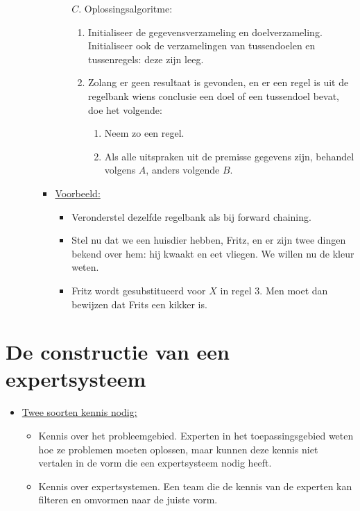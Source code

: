 \begin{itemize}
\begin{itemize}
\begin{itemize}
\begin{enumerate}
\begin{enumerate}
				\end{enumerate}
				\item[$C.$] Oplossingsalgoritme:
				\begin{enumerate}
					\item Initialiseer de gegevensverzameling en doelverzameling. Initialiseer ook de verzamelingen van tussendoelen en tussenregels: deze zijn leeg.
					\item Zolang er geen resultaat is gevonden, en er een regel is uit de regelbank wiens conclusie een doel of een tussendoel bevat, doe het volgende:
					\begin{enumerate}
						\item Neem zo een regel.
						\item Als alle uitspraken uit de premisse gegevens zijn, behandel volgens $A$, anders volgende $B$.
					\end{enumerate}
				\end{enumerate}
			\end{enumerate}
			\item \underline{Voorbeeld:}
			\begin{itemize}
				\item Veronderstel dezelfde regelbank als bij forward chaining.
				\item Stel nu dat we een huisdier hebben, Fritz,  en er zijn twee dingen bekend over hem: hij kwaakt en eet vliegen. We willen nu de kleur weten.
				\item Fritz wordt gesubstitueerd voor $X$ in regel 3. Men moet dan bewijzen dat Frits een kikker is.
			\end{itemize}
		\end{itemize}
	\end{itemize}
\end{itemize}
\section{De constructie van een expertsysteem}
\begin{itemize}
	\item \underline{Twee soorten kennis nodig:}
	\begin{itemize}
		\item Kennis over het probleemgebied. Experten in het toepassingsgebied weten hoe ze problemen moeten oplossen, maar kunnen deze kennis niet vertalen in de vorm die een expertsysteem nodig heeft.
		\item Kennis over expertsystemen. Een team die de kennis van de experten kan filteren en omvormen naar de juiste vorm. 
	\end{itemize}
\end{itemize}
